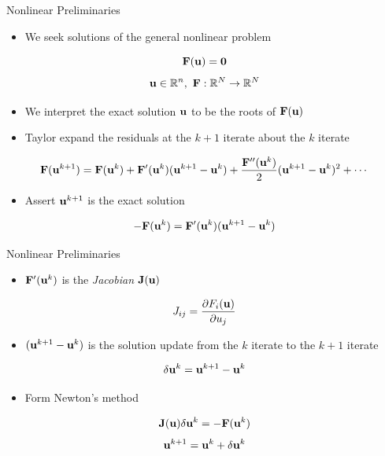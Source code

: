 \documentclass{beamer}
\begin{document}
\begin{frame}{Nonlinear Preliminaries}

  \begin{itemize}
  \item We seek solutions of the general nonlinear problem
  \end{itemize}

  \[
  \mathbf{F}(\mathbf{u}) = \mathbf{0}
  \]
  \[
  \mathbf{u} \in \mathbb{R}^n,\ \mathbf{F}:\mathbb{R}^N \rightarrow
  \mathbb{R}^N
  \]

  \begin{itemize}
  \item We interpret the exact solution $\mathbf{u}$ to be the roots of
    $\mathbf{F}(\mathbf{u})$
  \item Taylor expand the residuals at the $k+1$ iterate about the $k$
    iterate
  \end{itemize}

  \[
  \mathbf{F}(\mathbf{u}^{k+1}) = \mathbf{F}(\mathbf{u}^{k}) +
  \mathbf{F}'(\mathbf{u}^{k})(\mathbf{u}^{k+1}-\mathbf{u}^{k}) +
  \frac{\mathbf{F}''(\mathbf{u}^{k})}{2}(\mathbf{u}^{k+1}-\mathbf{u}^{k})^2 + \cdots
  \]

  \begin{itemize}
  \item Assert $\mathbf{u}^{k+1}$ is the exact solution
  \end{itemize}

  \[
  -\mathbf{F}(\mathbf{u}^{k}) = \mathbf{F}'(\mathbf{u}^{k})(\mathbf{u}^{k+1}-\mathbf{u}^{k})
  \]

\end{frame}

\begin{frame}{Nonlinear Preliminaries}

  \begin{itemize}
  \item $\mathbf{F}'(\mathbf{u}^{k})$ is the \textit{Jacobian}
    $\mathbf{J}(\mathbf{u})$
  \end{itemize}

  \[
  J_{ij} = \frac{\partial F_i(\mathbf{u})}{\partial u_j}
  \]

  \begin{itemize}
  \item $(\mathbf{u}^{k+1}-\mathbf{u}^{k})$ is the solution update from the
    $k$ iterate to the $k+1$ iterate
  \end{itemize}

  \[
  \delta \mathbf{u}^k = \mathbf{u}^{k+1}-\mathbf{u}^{k}
  \]

  \begin{itemize}
  \item Form Newton's method
  \end{itemize}
  \[
  \mathbf{J}(\mathbf{u}) \delta \mathbf{u}^k = -\mathbf{F}(\mathbf{u}^{k})
  \]
  \[
  \mathbf{u}^{k+1} = \mathbf{u}^k + \delta \mathbf{u}^k
  \]

\end{frame}
\end{document}

